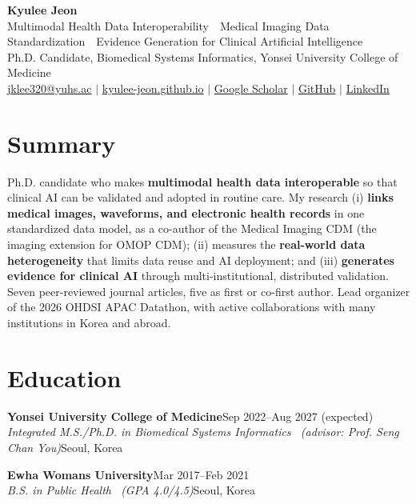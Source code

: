 \documentclass[10pt,letterpaper]{article}
\newcommand{\rt}[1]{\hfill{\sffamily\footnotesize\color{muted}#1}}
\newcommand{\entry}[4]{\textbf{#1}\rt{#2}\\\textit{#3}\rt{#4}\par\vspace{2pt}}
\begin{document}
\fontsize{9.5}{11}\selectfont
\begin{center}
{\sffamily\bfseries\fontsize{24}{28}\selectfont Kyulee Jeon}\\[5pt]
{\sffamily\small\color{accent}Multimodal Health Data Interoperability \,\textperiodcentered\, Medical Imaging Data Standardization \,\textperiodcentered\, Evidence Generation for Clinical Artificial Intelligence}\\[3pt]
Ph.D. Candidate, Biomedical Systems Informatics, Yonsei University College of Medicine\\[2pt]
\href{mailto:jklee320@yuhs.ac}{jklee320@yuhs.ac} \textcolor{muted}{$|$}
\href{https://kyulee-jeon.github.io}{kyulee-jeon.github.io} \textcolor{muted}{$|$}
\href{https://scholar.google.com/citations?user=WhhJ_usAAAAJ}{Google Scholar} \textcolor{muted}{$|$}
\href{https://github.com/kyulee-jeon}{GitHub} \textcolor{muted}{$|$}
\href{https://www.linkedin.com/in/kyulee-jeon-870415202}{LinkedIn}
\end{center}
\vspace{-6pt}

\section{Summary}
Ph.D. candidate who makes \textbf{multimodal health data interoperable} so that clinical AI can be validated and adopted in routine care.
My research (i) \textbf{links medical images, waveforms, and electronic health records} in one standardized data model, as a co-author of the Medical Imaging CDM (the imaging extension for OMOP CDM);
(ii) measures the \textbf{real-world data heterogeneity} that limits data reuse and AI deployment; and
(iii) \textbf{generates evidence for clinical AI} through multi-institutional, distributed validation.
Seven peer-reviewed journal articles, five as first or co-first author. Lead organizer of the 2026 OHDSI APAC Datathon, with active collaborations with many institutions in Korea and abroad.

\section{Education}
\entry{Yonsei University College of Medicine}{Sep 2022--Aug 2027 (expected)}{Integrated M.S./Ph.D. in Biomedical Systems Informatics \ (advisor: Prof. Seng Chan You)}{Seoul, Korea}
\entry{Ewha Womans University}{Mar 2017--Feb 2021}{B.S. in Public Health \ (GPA 4.0/4.5)}{Seoul, Korea}
\end{document}
